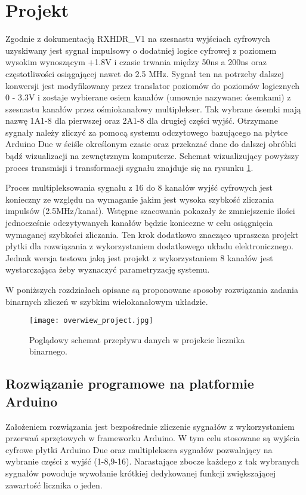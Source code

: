 \section{Projekt}
Zgodnie z dokumentacją RXHDR\_V1 \cite{master} na szesnastu wyjściach cyfrowych uzyskiwany jest sygnał impulsowy o dodatniej logice cyfrowej z poziomem wysokim wynoszącym +1.8V i czasie trwania między 50ns a 200ns oraz częstotliwości osiągającej nawet do 2.5 MHz.
Sygnał ten na potrzeby dalszej konwersji jest modyfikowany przez translator poziomów do poziomów logicznych 0 - 3.3V i zostaje wybierane osiem kanałów (umownie nazywane: ósemkami) z szesnastu kanałów przez ośmiokanałowy multiplekser.   
Tak wybrane ósemki mają nazwę 1A1-8 dla pierwszej oraz 2A1-8 dla drugiej części wyjść.   
Otrzymane sygnały należy zliczyć za pomocą systemu odczytowego bazującego na płytce Arduino Due w ściśle określonym czasie oraz przekazać dane do dalszej obróbki bądź wizualizacji na zewnętrznym komputerze. 
Schemat wizualizujący powyższy proces transmisji i transformacji sygnału znajduje się na rysunku \ref{projekt chart}.

Proces multipleksowania sygnału z 16 do 8 kanałów wyjść cyfrowych jest konieczny ze względu na wymaganie jakim jest wysoka szybkość zliczania impulsów (2.5MHz/kanał). Wstępne szacowania pokazały że zmniejszenie ilości jednocześnie odczytywanych kanałów będzie konieczne w celu osiągnięcia wymaganej szybkości zliczania. Ten krok dodatkowo znacząco upraszcza projekt płytki dla rozwiązania z wykorzystaniem dodatkowego układu elektronicznego. 
Jednak wersja testowa jaką jest projekt z wykorzystaniem 8 kanałów jest wystarczająca żeby wyznaczyć parametryzację systemu.    

W poniższych rozdziałach opisane są proponowane sposoby rozwiązania zadania binarnych zliczeń w szybkim wielokanałowym układzie. 

\begin{figure}[b]
        \centering
        \texttt{[image: overwiew\_project.jpg]}
        \caption{Poglądowy schemat przepływu danych w projekcie licznika binarnego.}
        \label{projekt chart}
\end{figure}

\newpage
\subsection{Rozwiązanie programowe na platformie Arduino}
\label{dzial arduino}
Założeniem rozwiązania jest bezpośrednie zliczenie sygnałów z wykorzystaniem przerwań sprzętowych w frameworku Arduino. W tym celu stosowane są wyjścia cyfrowe płytki Arduino Due oraz multipleksera sygnałów pozwalający na wybranie części z wyjść (1-8,9-16).
Narastające zbocze każdego z tak wybranych sygnałów  powoduje wywołanie krótkiej dedykowanej funkcji zwiększającej zawartość licznika o jeden. 

